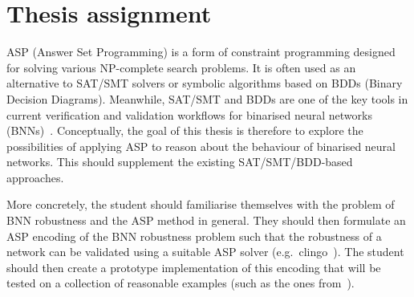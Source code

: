 \chapter*{Thesis assignment}

ASP (Answer Set Programming) is a form of constraint programming designed
for solving various NP-complete search problems. It is often used
as an alternative to SAT/SMT solvers or symbolic algorithms based on BDDs
(Binary Decision Diagrams). Meanwhile, SAT/SMT and BDDs are one of the key
tools in current verification and validation workflows for binarised
neural networks (BNNs)~\cite{zhang2021bdd4bnn}. Conceptually, the goal of this thesis is therefore
to explore the possibilities of applying ASP to reason about the behaviour
of binarised neural networks. This should supplement the existing
SAT/SMT/BDD-based approaches.

More concretely, the student should familiarise themselves with the problem
of BNN robustness and the ASP method in general. They should then formulate
an ASP encoding of the BNN robustness problem such that the robustness of
a network can be validated using a suitable ASP solver (e.g.\ clingo~\cite{gebser2019multi}).
The student should then create a prototype implementation of this encoding
that will be tested on a collection of reasonable examples
(such as the ones from~\cite{zhang2021bdd4bnn}).
